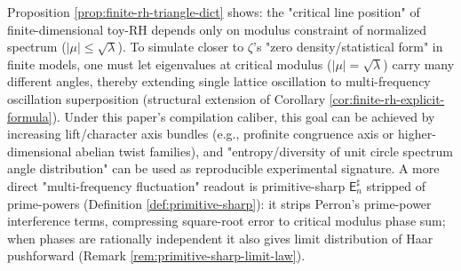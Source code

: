 \begin{remark}\label{rem:finite-rh-angle-entropy}
Proposition \ref{prop:finite-rh-triangle-dict} shows: the "critical line position" of finite-dimensional toy-RH depends only on modulus constraint of normalized spectrum (\( |\mu|\le \sqrt\lambda \)).
To simulate closer to \(\zeta\)'s "zero density/statistical form" in finite models, one must let eigenvalues at critical modulus (\(|\mu|=\sqrt\lambda\)) carry many different angles, thereby extending single lattice oscillation to multi-frequency oscillation superposition (structural extension of Corollary \ref{cor:finite-rh-explicit-formula}).
Under this paper's compilation caliber, this goal can be achieved by increasing lift/character axis bundles (e.g., profinite congruence axis or higher-dimensional abelian twist families), and "entropy/diversity of unit circle spectrum angle distribution" can be used as reproducible experimental signature.
A more direct "multi-frequency fluctuation" readout is primitive-sharp \(\mathsf{E}_n^\sharp\) stripped of prime-powers (Definition \ref{def:primitive-sharp}): it strips Perron's prime-power interference terms, compressing square-root error to critical modulus phase sum; when phases are rationally independent it also gives limit distribution of Haar pushforward (Remark \ref{rem:primitive-sharp-limit-law}).
\end{remark}

